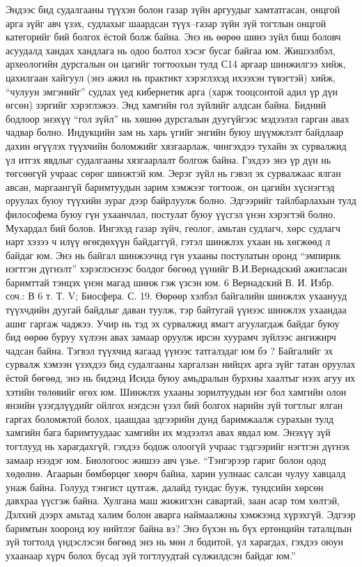 Эндээс бид судалгааны түүхэн болон газар зүйн аргуудыг хамтатгасан, онцгой арга зүйг авч үзэх, судлахыг шаардсан түүх–газар зүйн зүй тогтлын онцгой категорийг бий болгох ёстой болж байна. Энэ нь өөрөө шинэ зүйл биш боловч асуудалд хандах хандлага нь одоо болтол хэсэг бусаг байгаа юм. Жишээлбэл, археологийн дурсгалын он цагийг тогтоохын тулд С14 аргаар шинжилгээ хийж, цахилгаан хайгуул (энэ ажил нь практикт хэрэглэхэд ихээхэн түвэгтэй) хийж, “чулуун эмгэнийг” судлах үед кибернетик арга (харж тооцсонтой адил үр дүн өгсөн) зэргийг хэрэглэжээ. Энд хамгийн гол зүйлийг алдсан байна. Бидний бодлоор энэхүү “гол зүйл” нь хөшөө дурсгалын дуугүйгээс мэдээлэл гарган авах чадвар болно. Индукцийн зам нь харь үгийг энгийн буюу шүүмжлэлт байдлаар дахин өгүүлэх түүхчийн боломжийг хязгаарлаж, чингэхдээ тухайн эх сурвалжид үл итгэх явдлыг судалгааны хязгаарлалт болгож байна. Гэхдээ энэ үр дүн нь төгсөөгүй учраас сөрөг шинжтэй юм. Эерэг зүйл нь гэвэл эх сурвалжаас ялган авсан, маргаангүй баримтуудын зарим хэмжээг тогтоож, он цагийн хүснэгтэд оруулах буюу түүхийн зураг дээр байрлуулж болно. Эдгээрийг тайлбарлахын тулд философема буюу гүн ухаанчлал, постулат буюу үүсгэл үнэн хэрэгтэй болно. Мухардал бий болов.
Ингэхэд газар зүйч, геолог, амьтан судлагч, хөрс судлагч нарт хэзээ ч илүү өгөгдөхүүн байдаггүй, гэтэл шинжлэх ухаан нь хөгжөөд л байдаг юм. Энэ нь байгал шинжээчид гүн ухааны постулатын оронд “эмпирик нэгтгэн дүгнэлт” хэрэглэснээс болдог бөгөөд үүнийг В.И.Вернадский ажигласан баримттай тэнцэх үнэн магад шинж гэж үзсэн юм.
6 Вернадский В. И. Избр. соч.: В 6 т. Т. V; Биосфера. С. 19.
Өөрөөр хэлбэл байгалийн шинжлэх ухаанууд түүхчдийн дуугай байдлыг даван туулж, тэр байтугай үүнээс шинжлэх ухаандаа ашиг гаргаж чаджээ. Учир нь тэд эх сурвалжид ямагт агуулагдаж байдаг буюу бид өөрөө буруу хүлээн авах замаар оруулж ирсэн хуурамч зүйлээс ангижирч чадсан байна. Тэгвэл түүхчид яагаад үүнээс татгалздаг юм бэ ? Байгалийг эх сурвалж хэмээн үзэхдээ бид судалгааны харгалзан нийцэх арга зүйг татан оруулах ёстой бөгөөд, энэ нь бидэнд Исида буюу амьдралын бурхны хаалтыг нээх агуу их хэтийн төлөвийг өгөх юм.
Шинжлэх ухааны зорилтуудын нэг бол хамгийн олон янзийн үзэгдлүүдийг ойлгох нэгдсэн үзэл бий болгох нарийн зүй тогтлыг ялган гаргах боломжтой болох, цаашдаа эдгээрийн дунд баримжаалж сурахын тулд хамгийн бага баримтуудаас хамгийн их мэдээлэл авах явдал юм. Энэхүү зүй тогтлууд нь харагдахгүй, гэхдээ бодож олоогүй учраас тэдгээрийг нэгтгэн дүгнэх замаар нээдэг юм. Биологоос жишээ авч үзье. “Тэнгэрээр гариг болон одод хөдөлнө. Агаарын бөмбөрцөг хөөрч байна, харин уулнаас салсан чулуу хавцалд унаж байна. Голууд тэнгист цутгаж, далайд тундас бууж, тундсийн хөрсөн давхраа үүсгэж байна. Хулгана маш жижигхэн савартай, заан асар том хөлтэй, Дэлхий дээрх амьтад халим болон аварга наймаалжны хэмжээнд хүрэхгүй. Эдгээр баримтын хооронд юу нийтлэг байна вэ? Энэ бүхэн нь бүх ертөнцийн таталцлын зүй тогтолд үндэслэсэн бөгөөд энэ нь мөн л бодитой, үл харагдах, гэхдээ оюун ухаанаар хүрч болох бусад зүй тогтлуудтай сүлжилдсэн байдаг юм.”
